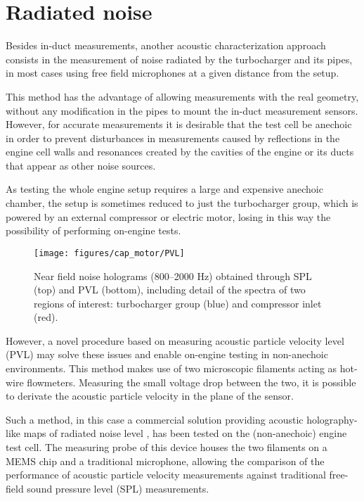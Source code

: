 \section{Radiated noise}
\label{sub:radiated_noise_measurement}

Besides in-duct measurements, another acoustic characterization approach consists in the measurement of noise radiated by the turbocharger and its pipes, in most cases using free field microphones at a given distance from the setup.

This method has the advantage of allowing measurements with the real geometry, without any modification in the pipes to mount the in-duct measurement sensors. However, for accurate measurements it is desirable that the test cell be anechoic in order to prevent disturbances in measurements caused by reflections in the engine cell walls and resonances created by the cavities of the engine or its ducts that appear as other noise sources.

As testing the whole engine setup requires a large and expensive anechoic chamber, the setup is sometimes reduced to just the turbocharger group, which is powered by an external compressor or electric motor, losing in this way the possibility of performing on-engine tests.

\begin{figure}[b!]
\centering
\texttt{[image: figures/cap\_motor/PVL]}
\caption{Near field noise holograms (800--2000 Hz) obtained through SPL (top) and PVL (bottom), including detail of the spectra of two regions of interest: turbocharger group (blue) and compressor inlet (red).}
\label{fig:PVL}
\end{figure}

However, a novel procedure based on measuring acoustic particle velocity level (PVL) may solve these issues \cite{jacobsen2005comparison} and enable on-engine testing in non-anechoic environments. This method makes use of two microscopic filaments acting as hot-wire flowmeters. Measuring the small voltage drop between the two, it is possible to derivate the acoustic particle velocity in the plane of the sensor.

Such a method, in this case a commercial solution providing acoustic holography-like maps of radiated noise level \cite{comesana2013scan}, has been tested on the (non-anechoic) engine test cell. The measuring probe of this device houses the two filaments on a MEMS chip and a traditional microphone, allowing the comparison of the performance of acoustic particle velocity measurements against traditional free-field sound pressure level (SPL) measurements.

